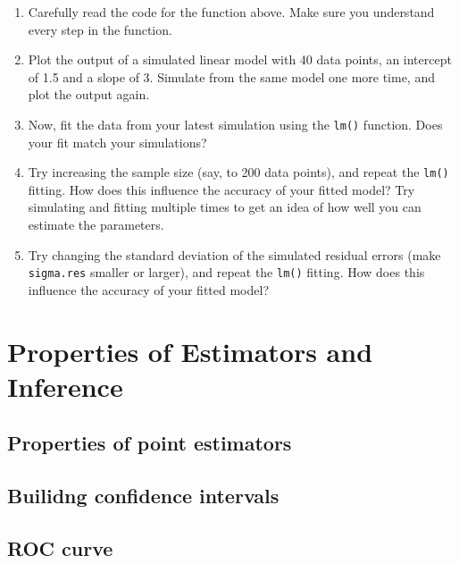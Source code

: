 \documentclass[
]{book}
\providecommand{\tightlist}{%
  \setlength{\itemsep}{0pt}\setlength{\parskip}{0pt}}
\begin{document}
\begin{enumerate}
\def\labelenumi{\alph{enumi})}
\tightlist
\item
  Carefully read the code for the function above. Make sure you understand every step in the function.\\
\item
  Plot the output of a simulated linear model with 40 data points, an intercept of 1.5 and a slope of 3. Simulate from the same model one more time, and plot the output again.\\
\item
  Now, fit the data from your latest simulation using the \texttt{lm()} function. Does your fit match your simulations?\\
\item
  Try increasing the sample size (say, to 200 data points), and repeat the \texttt{lm()} fitting. How does this influence the accuracy of your fitted model? Try simulating and fitting multiple times to get an idea of how well you can estimate the parameters.\\
\item
  Try changing the standard deviation of the simulated residual errors (make \texttt{sigma.res} smaller or larger), and repeat the \texttt{lm()} fitting. How does this influence the accuracy of your fitted model?
\end{enumerate}

\hypertarget{properties-of-estimators-and-inference}{%
\chapter{Properties of Estimators and Inference}\label{properties-of-estimators-and-inference}}

\hypertarget{properties-of-point-estimators}{%
\section{Properties of point estimators}\label{properties-of-point-estimators}}

\hypertarget{builidng-confidence-intervals}{%
\section{Builidng confidence intervals}\label{builidng-confidence-intervals}}

\hypertarget{roc-curve}{%
\section{ROC curve}\label{roc-curve}}
\end{document}
